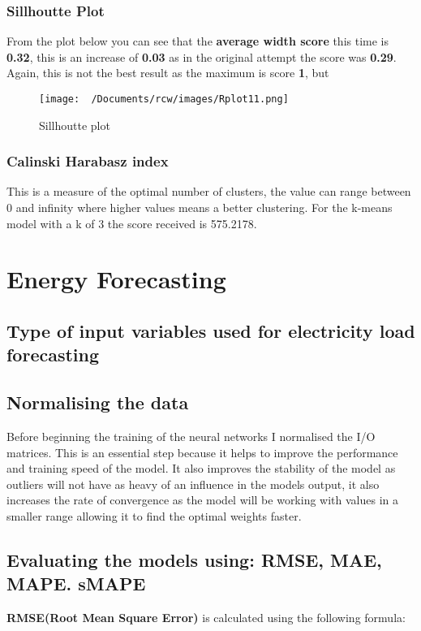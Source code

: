 \documentclass[11pt]{article}
\begin{document}
\newpage
\subsubsection{Sillhoutte Plot}

From the plot below you can see that the \textbf{average width score} this time is \textbf{0.32}, this is an increase of \textbf{0.03}
as in the original attempt the score was \textbf{0.29}. Again, this is not the best result as the maximum is score \textbf{1}, but 
\begin{figure}[H]
  \centering
  \texttt{[image: ~/Documents/rcw/images/Rplot11.png]}
  \caption{Sillhoutte plot}
\end{figure}

\subsubsection{Calinski Harabasz index}
This is a measure of the optimal number of clusters, the value can range between 0 and infinity where higher
values means a better clustering. For the k-means model with a k of 3 the score received is 575.2178.

\section{Energy Forecasting}
\subsection{Type of input variables used for electricity load forecasting}

\subsection{Normalising the data}
Before beginning the training of the neural networks I normalised the I/O matrices. This is an essential step because it helps to improve the 
performance and training speed of the model. It also improves the stability of the model as outliers will not have as heavy of an influence in the models 
output, it also increases the rate of convergence as the model will be working with values in a smaller range allowing it to find the optimal weights faster.

\subsection{Evaluating the models using: RMSE, MAE, MAPE. sMAPE}
\textbf{RMSE(Root Mean Square Error)} is calculated using the following formula:
\end{document}
